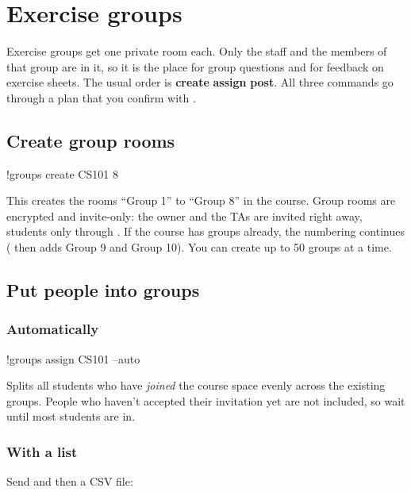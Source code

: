 \chapter{Exercise groups}
\label{ch:groups}

Exercise groups get one private room each. Only the staff and the members of that group are
in it, so it is the place for group questions and for feedback on exercise sheets. The usual
order is \textbf{create} \then \textbf{assign} \then \textbf{post}.
All three commands go through a plan that you confirm with .

\section{Create group rooms}

\begin{you}
!groups create CS101 8
\end{you}

This creates the rooms \enquote{Group 1} to \enquote{Group 8} in the course. Group rooms are
encrypted and invite-only: the owner and the TAs are invited right away, students only
through . If the course has groups already, the numbering continues
( then adds Group 9 and Group 10). You can create up to 50
groups at a time.

\section{Put people into groups}

\subsection*{Automatically}

\begin{you}
!groups assign CS101 --auto
\end{you}

Splits all students who have \emph{joined} the course space evenly across the existing
groups. People who haven't accepted their invitation yet are not included, so wait until
most students are in.

\subsection*{With a list}

Send  and then a CSV file:

